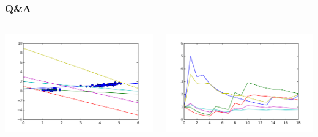 \documentclass{beamer}
\begin{document}
  \begin{frame}
  \frametitle{Q\&A}
    \begin{columns}
      \begin{column}{5cm}
        \includegraphics[scale=.4]{graphics/gypothesis} 
      \end{column}
      \begin{column}{5cm}
        \includegraphics[scale=.4]{graphics/convergence15} 
      \end{column}
    \end{columns}
  \end{frame}
\end{document}
